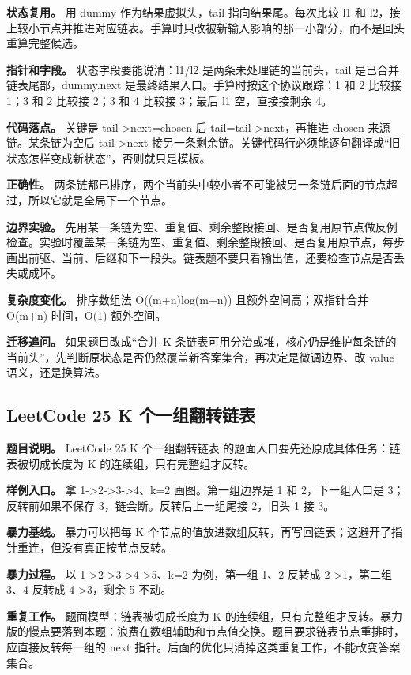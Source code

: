 \textbf{状态复用。} 用 dummy 作为结果虚拟头，tail 指向结果尾。每次比较 l1 和 l2，接上较小节点并推进对应链表。手算时只改被新输入影响的那一小部分，而不是回头重算完整候选。

\textbf{指针和字段。} 状态字段要能说清：l1/l2 是两条未处理链的当前头，tail 是已合并链表尾部，dummy.next 是最终结果入口。手算时按这个协议跟踪：1 和 2 比较接 1；3 和 2 比较接 2；3 和 4 比较接 3；最后 l1 空，直接接剩余 4。

\textbf{代码落点。} 关键是 tail->next=chosen 后 tail=tail->next，再推进 chosen 来源链。某条链为空后 tail->next 接另一条剩余链。关键代码行必须能逐句翻译成“旧状态怎样变成新状态”，否则就只是模板。

\textbf{正确性。} 两条链都已排序，两个当前头中较小者不可能被另一条链后面的节点超过，所以它就是全局下一个节点。

\textbf{边界实验。} 先用某一条链为空、重复值、剩余整段接回、是否复用原节点做反例检查。实验时覆盖某一条链为空、重复值、剩余整段接回、是否复用原节点，每步画出前驱、当前、后继和下一段头。链表题不要只看输出值，还要检查节点是否丢失或成环。

\textbf{复杂度变化。} 排序数组法 O((m+n)log(m+n)) 且额外空间高；双指针合并 O(m+n) 时间，O(1) 额外空间。

\textbf{迁移追问。} 如果题目改成“合并 K 条链表可用分治或堆，核心仍是维护每条链的当前头”，先判断原状态是否仍然覆盖新答案集合，再决定是微调边界、改 value 语义，还是换算法。

\subsection{LeetCode 25 K 个一组翻转链表}

\textbf{题目说明。} LeetCode 25 K 个一组翻转链表 的题面入口要先还原成具体任务：链表被切成长度为 K 的连续组，只有完整组才反转。

\textbf{样例入口。} 拿 1->2->3->4、k=2 画图。第一组边界是 1 和 2，下一组入口是 3；反转前如果不保存 3，链会断。反转后上一组尾接 2，旧头 1 接 3。

\textbf{暴力基线。} 暴力可以把每 K 个节点的值放进数组反转，再写回链表；这避开了指针重连，但没有真正按节点反转。

\textbf{暴力过程。} 以 1->2->3->4->5、k=2 为例，第一组 1、2 反转成 2->1，第二组 3、4 反转成 4->3，剩余 5 不动。

\textbf{重复工作。} 题面模型：链表被切成长度为 K 的连续组，只有完整组才反转。暴力版的慢点要落到本题：浪费在数组辅助和节点值交换。题目要求链表节点重排时，应直接反转每一组的 next 指针。后面的优化只消掉这类重复工作，不能改变答案集合。

